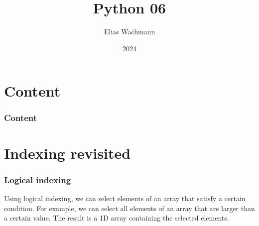 \documentclass{beamer}
\title[]
{Python 06}
\author[E.~Wachmann]{\scriptsize Elias Wachmann
}
\date{2024} %
\institute[Institute of Theoretical and Computational Physics]
{
}
\begin{document}
\titleframe


\section*{Content}

\begin{frame}
\frametitle{Content}
  \tableofcontents
\end{frame}

\section{Indexing revisited}
\begin{frame}
  \frametitle{Logical indexing}
  Using logical indexing, we can select elements of an array that satisfy a certain condition. For example, we can select all elements of an array that are larger than a certain value. The result is a 1D array containing the selected elements. 
  
\end{frame}
\end{document}
